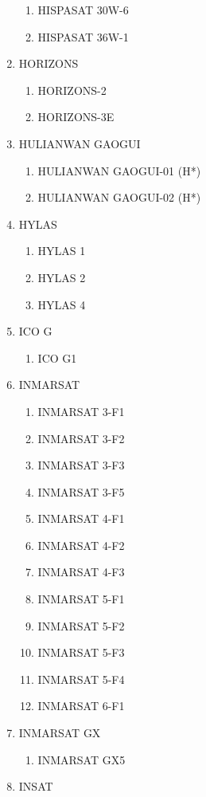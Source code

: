 \begin{multicols}{2}
\begin{enumerate}
\begin{enumerate}
    \item HISPASAT 30W-6
    \item HISPASAT 36W-1
  \end{enumerate}
  \item HORIZONS
  \begin{enumerate}
    \item HORIZONS-2
    \item HORIZONS-3E
  \end{enumerate}
  \item HULIANWAN GAOGUI
  \begin{enumerate}
    \item HULIANWAN GAOGUI-01 (H*)
    \item HULIANWAN GAOGUI-02 (H*)
  \end{enumerate}
  \item HYLAS
  \begin{enumerate}
    \item HYLAS 1
    \item HYLAS 2
    \item HYLAS 4
  \end{enumerate}
  \item ICO G
  \begin{enumerate}
    \item ICO G1
  \end{enumerate}
  \item INMARSAT
  \begin{enumerate}
    \item INMARSAT 3-F1
    \item INMARSAT 3-F2
    \item INMARSAT 3-F3
    \item INMARSAT 3-F5
    \item INMARSAT 4-F1
    \item INMARSAT 4-F2
    \item INMARSAT 4-F3
    \item INMARSAT 5-F1
    \item INMARSAT 5-F2
    \item INMARSAT 5-F3
    \item INMARSAT 5-F4
    \item INMARSAT 6-F1
  \end{enumerate}
  \item INMARSAT GX
  \begin{enumerate}
    \item INMARSAT GX5
  \end{enumerate}
  \item INSAT

\end{enumerate}
\end{multicols}
